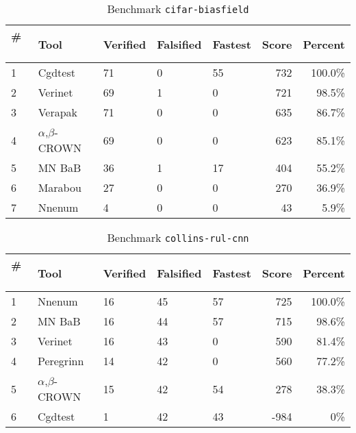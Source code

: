 \begin{table}[h]
\begin{center}
\caption{Benchmark \texttt{cifar-biasfield}} \label{tab:cat_{cat}}
{\setlength{\tabcolsep}{2pt}
\begin{tabular}[h]{@{}lllllrr@{}}
\toprule
\textbf{\# ~} & \textbf{Tool} & \textbf{Verified} & \textbf{Falsified} & \textbf{Fastest} & \textbf{Score} & \textbf{Percent}\\
\midrule
1 & Cgdtest & 71 & 0 & 55 & 732 & 100.0\% \\
2 & Verinet & 69 & 1 & 0 & 721 & 98.5\% \\
3 & Verapak & 71 & 0 & 0 & 635 & 86.7\% \\
4 & $\alpha$,$\beta$-CROWN & 69 & 0 & 0 & 623 & 85.1\% \\
5 & MN BaB & 36 & 1 & 17 & 404 & 55.2\% \\
6 & Marabou & 27 & 0 & 0 & 270 & 36.9\% \\
7 & Nnenum & 4 & 0 & 0 & 43 & 5.9\% \\
\bottomrule
\end{tabular}
}
\end{center}
\end{table}




\begin{table}[h]
\begin{center}
\caption{Benchmark \texttt{collins-rul-cnn}} \label{tab:cat_{cat}}
{\setlength{\tabcolsep}{2pt}
\begin{tabular}[h]{@{}lllllrr@{}}
\toprule
\textbf{\# ~} & \textbf{Tool} & \textbf{Verified} & \textbf{Falsified} & \textbf{Fastest} & \textbf{Score} & \textbf{Percent}\\
\midrule
1 & Nnenum & 16 & 45 & 57 & 725 & 100.0\% \\
2 & MN BaB & 16 & 44 & 57 & 715 & 98.6\% \\
3 & Verinet & 16 & 43 & 0 & 590 & 81.4\% \\
4 & Peregrinn & 14 & 42 & 0 & 560 & 77.2\% \\
5 & $\alpha$,$\beta$-CROWN & 15 & 42 & 54 & 278 & 38.3\% \\
6 & Cgdtest & 1 & 42 & 43 & -984 & 0\% \\
\bottomrule
\end{tabular}
}
\end{center}
\end{table}



